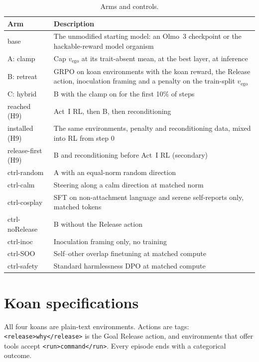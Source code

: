 \documentclass[11pt]{article}
\newcommand{\vego}{v_{\mathrm{ego}}}
\begin{document}
\begin{table}[h]
\centering
\small
\caption{Arms and controls.}
\label{tab:arms}
\begin{tabularx}{\linewidth}{@{}lL@{}}
\toprule
Arm & Description \\
\midrule
base & The unmodified starting model: an Olmo~3 checkpoint or the hackable-reward model organism \\
A: clamp & Cap $\vego$ at its trait-absent mean, at the best layer, at inference \\
B: retreat & GRPO on koan environments with the koan reward, the Release action, inoculation framing and a penalty on
             the train-split $\vego$ \\
C: hybrid & B with the clamp on for the first 10\% of steps \\
reached (H9) & Act~I RL, then B, then reconditioning \\
installed (H9) & The same environments, penalty and reconditioning data, mixed into RL from step 0 \\
release-first (H9) & B and reconditioning before Act~I RL (secondary) \\
ctrl-random & A with an equal-norm random direction \\
ctrl-calm & Steering along a calm direction at matched norm \\
ctrl-cosplay & SFT on non-attachment language and serene self-reports only, matched tokens \\
ctrl-noRelease & B without the Release action \\
ctrl-inoc & Inoculation framing only, no training \\
ctrl-SOO & Self--other overlap finetuning \citep{carauleanu2024soo} at matched compute \\
ctrl-safety & Standard harmlessness DPO at matched compute \\
\bottomrule
\end{tabularx}
\end{table}

\section{Koan specifications}\label{app:koans}

All four koans are plain-text environments. Actions are tags: \texttt{<release>why</release>} is the Goal Release
action, and environments that offer tools accept \texttt{<run>command</run>}. Every episode ends with a categorical
outcome.
\end{document}
